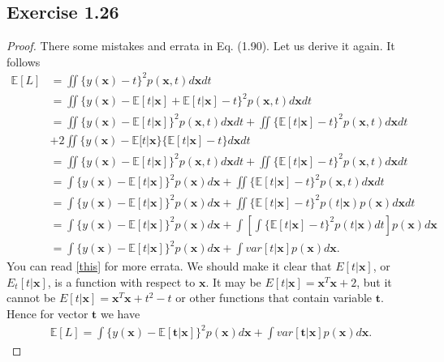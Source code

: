 \documentclass[11pt]{article}
\theoremstyle{definition}
\newcommand{\E}{\mathbb{E}}
\begin{document}
\subsection{Exercise 1.26}
\begin{proof}
There some mistakes and errata in Eq. (1.90). Let us derive it again. It follows
\begin{align*}
\E[L] &= \iint\{y(\textbf{x})-t\}^2p(\textbf{x}, t)d\textbf{x}dt\\
&= \iint\{y(\textbf{x})-\E[t|\textbf{x}]+\E[t|\textbf{x}]-t\}^2p(\textbf{x}, t)d\textbf{x}dt \\
&= \iint\{y(\textbf{x})-\E[t|\textbf{x}]\}^2p(\textbf{x}, t)d\textbf{x}dt + \iint\{\E[t|\textbf{x}]-t\}^2p(\textbf{x}, t)d\textbf{x}dt \\
&+ 2\iint\{y(\textbf{x})-\E[t|\textbf{x}\}\{\E[t|\textbf{x}]-t\}d\textbf{x}dt \\
&= \iint\{y(\textbf{x})-\E[t|\textbf{x}]\}^2p(\textbf{x}, t)d\textbf{x}dt + \iint\{\E[t|\textbf{x}]-t\}^2p(\textbf{x}, t)d\textbf{x}dt \\
&= \int\{y(\textbf{x})-\E[t|\textbf{x}]\}^2p(\textbf{x})d\textbf{x} + \iint\{\E[t|\textbf{x}]-t\}^2p(\textbf{x}, t)d\textbf{x}dt \\
&=\int\{y(\textbf{x})-\E[t|\textbf{x}]\}^2p(\textbf{x})d\textbf{x} + \iint\{\E[t|\textbf{x}]-t\}^2p(t|\textbf{x})p(\textbf{x})d\textbf{x}dt \\
&= \int\{y(\textbf{x})-\E[t|\textbf{x}]\}^2p(\textbf{x})d\textbf{x} + \int\left[\int\{\E[t|\textbf{x}]-t\}^2p(t|\textbf{x})dt\right]p(\textbf{x})d\textbf{x} \\
&= \int\{y(\textbf{x})-\E[t|\textbf{x}]\}^2p(\textbf{x})d\textbf{x} + \int var[t|\textbf{x}]p(\textbf{x})d\textbf{x}.
\end{align*}
You can read \href{https://www.microsoft.com/en-us/research/wp-content/uploads/2016/05/prml-errata-1st-20110921.pdf}{[this]} for more errata. We should make it clear that $E[t|\textbf{x}]$, or $E_t[t|\textbf{x}]$, is a function with respect to $\textbf{x}$. It may be $E[t|\textbf{x}] = \textbf{x}^T\textbf{x} + 2$, but it cannot be $E[t|\textbf{x}] = \textbf{x}^T\textbf{x} + t^2-t$ or other functions that contain variable $\textbf{t}$. Hence for vector $\textbf{t}$ we have
\begin{align*}
\E[L] = \int\{y(\textbf{x})-\E[\textbf{t}|\textbf{x}]\}^2p(\textbf{x})d\textbf{x} + \int var[\textbf{t}|\textbf{x}]p(\textbf{x})d\textbf{x}.
\end{align*}
\end{proof}
\end{document}
